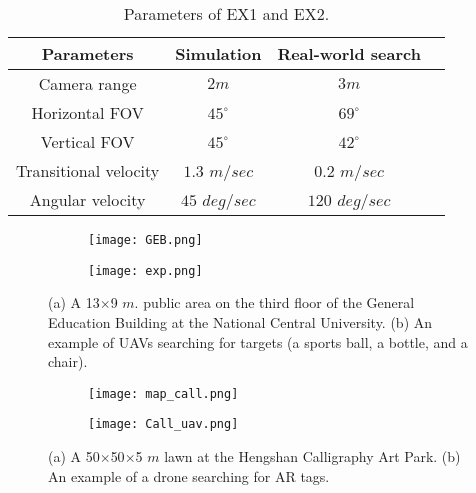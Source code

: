 \renewcommand{\arraystretch}{1.3}
\begin{table}[h]
\caption{Parameters of EX1 and EX2.}
\begin{center}
\begin{tabular}{|c||c|c|c|}
\hline
Parameters & Simulation & Real-world search \\
\hline\hline
Camera range & $2m$ & $3m$  \\
\hline
Horizontal FOV & $45^{\circ}$ & $69^{\circ}$  \\
\hline
Vertical FOV & $45^{\circ}$ & $42^{\circ}$ \\
\hline
Transitional velocity & $1.3$ $m/sec$ & $0.2$ $m/sec$ \\
\hline
Angular velocity & $45$ $deg/sec$ & $120$ $deg/sec$ \\
\hline
\end{tabular}
\label{Tab:parameters}
\end{center}
\end{table}


\begin{figure}
    \centering
    \begin{subfigure}[b]{0.5\textwidth}
        \texttt{[image: GEB.png]}
        \caption{} \label{GEB map}
    \end{subfigure}
    \begin{subfigure}[b]{0.5\textwidth}
    \centering
        \texttt{[image: exp.png]}
        \caption{} \label{GEB exp}
    \end{subfigure}
    \hfill
    \caption{(a) A 13$\times$9 $m.$ public area on the third floor of the General Education Building at the National Central University. (b) An example of UAVs searching for targets (a sports ball, a bottle, and a chair).
    }
    \label{GEB_fig}
\end{figure}

\begin{figure}
  \centering
  \begin{subfigure}[b]{0.5\textwidth}
      \texttt{[image: map\_call.png]}
      \caption{} \label{Call map}
  \end{subfigure}
  \begin{subfigure}[b]{0.5\textwidth}
  \centering
      \texttt{[image: Call\_uav.png]}
      \caption{} \label{Call exp}
  \end{subfigure}
  \hfill
  \caption{(a) A 50$\times$50$\times$5 $m$ lawn at the Hengshan Calligraphy Art Park. (b) An example of a drone searching for AR tags.
  }
  \label{Call_fig}
\end{figure}

